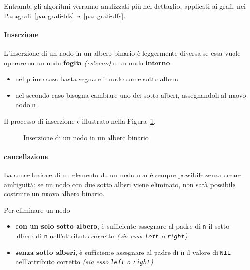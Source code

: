 \documentclass[italian, 10pt]{article}
\begin{document}
\bigskip
Entrambi gli algoritmi verranno analizzati più nel dettaglio, applicati ai grafi, nei Paragrafi~\ref{par:grafi-bfs}~e~\ref{par:grafi-dfs}.

\paragraph{Inserzione}
\label{par:inserzione-albero-binario}

L'inserzione di un nodo in un albero binario è leggermente diversa se essa vuole operare su un nodo \textbf{foglia} \textit{(esterno)} o un nodo \textbf{interno}:

\begin{itemize}
  \item nel primo caso basta segnare il nodo come sotto albero
  \item nel secondo caso bisogna cambiare uno dei sotto alberi, assegnandoli al nuovo nodo \texttt{n}
\end{itemize}

\bigskip
Il processo di inserzione è illustrato nella Figura~\ref{fig:inserzione-albero-binario}.

\begin{figure}[htbp]
  \bigskip
  \centering
  \caption{Inserzione di un nodo in un albero binario}
  \label{fig:inserzione-albero-binario}
  \bigskip
\end{figure}

\paragraph{cancellazione}
\label{par:cancellazione-albero-binario}

La cancellazione di un elemento da un nodo non è sempre possibile senza creare ambiguità: se un nodo con due sotto alberi viene eliminato, non sarà possibile costruire un nuovo albero binario.

Per eliminare un nodo

\begin{itemize}
  \item \textbf{con un solo sotto albero}, è sufficiente assegnare al padre di \texttt{n} il sotto albero di \texttt{n} nell'attributo corretto \textit{(sia esso \texttt{left} o \texttt{right})}
  \item \textbf{senza sotto alberi}, è sufficiente assegnare al padre di \texttt{n} il valore di \texttt{NIL} nell'attributo corretto \textit{(sia esso \texttt{left} o \texttt{right})}
\end{itemize}
\end{document}
